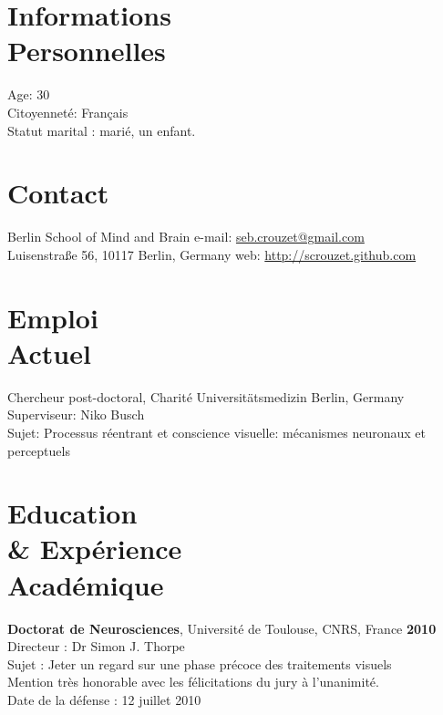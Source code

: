 \documentclass[margin,line]{resume}
\begin{document}
\begin{resume}

\section{\mysidestyle Informations\\Personnelles}
    Age: 30\\
    Citoyenneté: Français\\
    Statut marital : marié, un enfant.

\vspace{3mm}
\section{\mysidestyle Contact}
    Berlin School of Mind and Brain             \hfill e-mail: \href{mailto:seb.crouzet@gmail.com}{seb.crouzet@gmail.com} \\
    Luisenstraße 56, 10117 Berlin, Germany      \hfill web: \url{http://scrouzet.github.com} 
    
\vspace{3mm}
\section{\mysidestyle Emploi\\Actuel}
    Chercheur post-doctoral, Charité Universitätsmedizin Berlin, Germany\\
    Superviseur: Niko Busch\\
    Sujet: Processus réentrant et conscience visuelle: mécanismes neuronaux et perceptuels
	

\vspace{3mm}
\section{\mysidestyle Education \\ \& Expérience \\ Académique}
    
    \textbf{Doctorat de Neurosciences}, Université de Toulouse, CNRS, France \hfill \textbf{2010}\\
	Directeur :  Dr Simon J. Thorpe\\
	Sujet : Jeter un regard sur une phase précoce des traitements visuels\\
	Mention très honorable avec les félicitations du jury à l'unanimité.\\
	Date de la défense : 12 juillet 2010
	\vspace{-1.5mm}
	

\end{resume}
\end{document}
